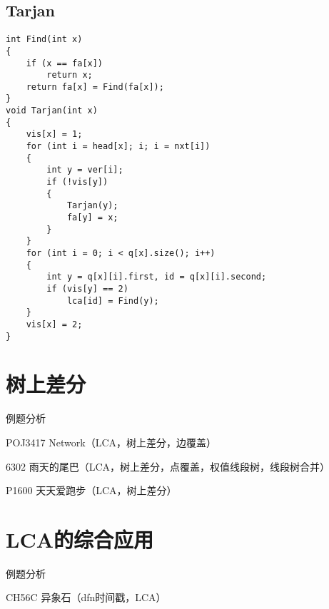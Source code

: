 \subsection{Tarjan}
\begin{lstlisting}
int Find(int x)
{
    if (x == fa[x])
        return x;
    return fa[x] = Find(fa[x]);
}
void Tarjan(int x)
{
    vis[x] = 1;
    for (int i = head[x]; i; i = nxt[i])
    {
        int y = ver[i];
        if (!vis[y])
        {
            Tarjan(y);
            fa[y] = x;
        }
    }
    for (int i = 0; i < q[x].size(); i++)
    {
        int y = q[x][i].first, id = q[x][i].second;
        if (vis[y] == 2)
            lca[id] = Find(y);
    }
    vis[x] = 2;
}
\end{lstlisting}

\section{树上差分}
例题分析

POJ3417 Network（LCA，树上差分，边覆盖）

6302 雨天的尾巴（LCA，树上差分，点覆盖，权值线段树，线段树合并）

P1600 天天爱跑步（LCA，树上差分）

\section{LCA的综合应用}
例题分析

CH56C 异象石（dfn时间戳，LCA）

